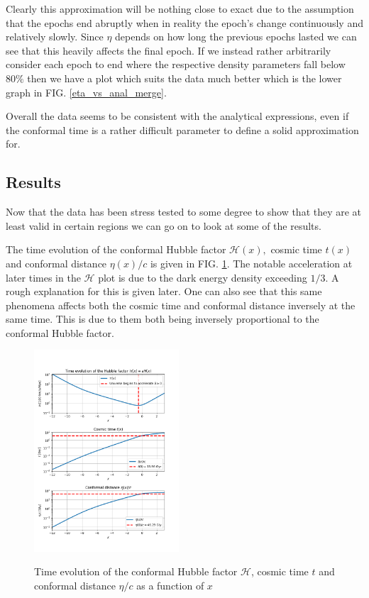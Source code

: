 \documentclass[%
reprint,
 amsmath,amssymb,
 aps,
]{revtex4-2}
\newcommand{\Hp}{\mathcal{H}}
\begin{document}
Clearly this approximation will be nothing close to exact due to the assumption that the epochs end abruptly when in reality the epoch's change continuously and relatively slowly. Since $\eta$ depends on how long the previous epochs lasted we can see that this heavily affects the final epoch. If we instead rather arbitrarily consider each epoch to end where the respective density parameters fall below $80\%$ then we have a plot which suits the data much better which is the lower graph in FIG. \ref{eta_vs_anal_merge}.

Overall the data seems to be consistent with the analytical expressions, even if the conformal time is a rather difficult parameter to define a solid approximation for.

\subsection{Results}

Now that the data has been stress tested to some degree to show that they are at least valid in certain regions we can go on to look at some of the results.

The time evolution of the conformal Hubble factor $\Hp(x),$ cosmic time $t(x)$ and conformal distance $\eta(x)/c$ is given in FIG. \ref{TimeEvHp}. The notable acceleration at later times in the $\Hp$ plot is due to the dark energy density exceeding $1/3$. A rough explanation for this is given later. One can also see that this same phenomena affects both the cosmic time and conformal distance inversely at the same time. This is due to them both being inversely proportional to the conformal Hubble factor.
\begin{figure}
	\caption{Time evolution of the conformal Hubble factor $\Hp$, cosmic time $t$ and conformal distance $\eta/c$ as a function of $x$}
	\includegraphics[width = 0.48\textwidth]{Figures/merge_Hp_t_eta_Ev.png}
	\label{TimeEvHp}
\end{figure}
\end{document}
